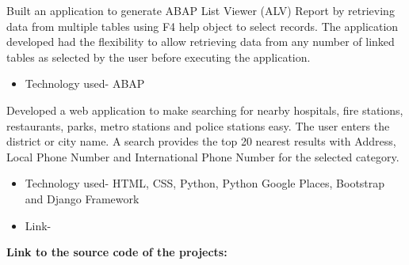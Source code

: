 \documentclass[9.5pt,a4paper]{altacv}
\begin{document}
\tagline{}

\begin{fullwidth}
\makecvheader
\end{fullwidth}


Built an application to generate ABAP List Viewer (ALV) Report by retrieving data from multiple tables using F4 help object to select records. The application developed had the flexibility to allow retrieving data from any number of linked tables as selected by the user before executing the application.
\begin{itemize}
\item Technology used- ABAP
\end{itemize}

\divider

Developed a web application to make searching for nearby hospitals, fire stations, restaurants, parks, metro stations and police stations easy. The user enters the district or city name. A search provides the top 20 nearest results with Address, Local Phone Number and International Phone Number for the selected category.
\begin{itemize}
\item Technology used- HTML, CSS, Python, Python Google Places, Bootstrap and Django Framework
\item Link- \href{https://find-my-perfect-place.herokuapp.com/}{}
\end{itemize}


\textbf{Link to the source code of the projects:} \href{https://github.com/Diksha-Rathi}{}
\end{document}
